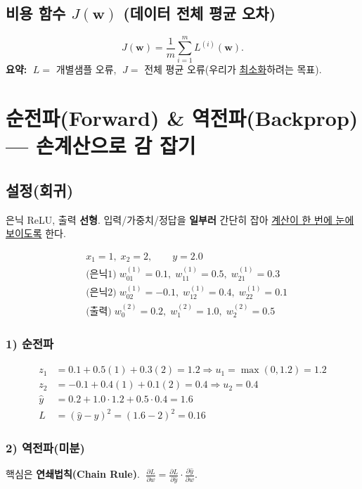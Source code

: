 \documentclass[12pt]{article}
\begin{document}
\subsection{비용 함수 $J(\mathbf{w})$ (데이터 전체 평균 오차)}
\[
J(\mathbf{w}) = \frac{1}{m}\sum_{i=1}^m L^{(i)}(\mathbf{w}).
\]
\textbf{요약:} \(\;L=\) 개별샘플 오류, \(\;J=\) 전체 평균 오류(우리가 \underline{최소화}하려는 목표).

\section{순전파(Forward) \& 역전파(Backprop) — 손계산으로 감 잡기}
\subsection{설정(회귀)}
은닉 ReLU, 출력 \textbf{선형}. 입력/가중치/정답을 \textbf{일부러} 간단히 잡아 \underline{계산이 한 번에 눈에 보이도록} 한다.

\[
\begin{aligned}
&x_1=1,\; x_2=2,\qquad y=2.0 \\
&\text{(은닉1)}\; w^{(1)}_{01}=0.1,\; w^{(1)}_{11}=0.5,\; w^{(1)}_{21}=0.3 \\
&\text{(은닉2)}\; w^{(1)}_{02}=-0.1,\; w^{(1)}_{12}=0.4,\; w^{(1)}_{22}=0.1 \\
&\text{(출력)}\; w^{(2)}_0=0.2,\; w^{(2)}_1=1.0,\; w^{(2)}_2=0.5
\end{aligned}
\]

\subsubsection*{1) 순전파}
\[
\begin{aligned}
z_1 &= 0.1 + 0.5(1) + 0.3(2) = 1.2 \Rightarrow u_1=\max(0,1.2)=1.2\\
z_2 &= -0.1 + 0.4(1) + 0.1(2)=0.4 \Rightarrow u_2=0.4\\
\hat{y} &= 0.2 + 1.0\cdot 1.2 + 0.5\cdot 0.4 = 1.6\\
L &= (\hat{y}-y)^2 = (1.6-2)^2 = 0.16
\end{aligned}
\]

\subsubsection*{2) 역전파(미분)}
핵심은 \textbf{연쇄법칙(Chain Rule)}. \(\; \frac{\partial L}{\partial w}=\frac{\partial L}{\partial \hat{y}}\cdot \frac{\partial \hat{y}}{\partial w}\).
\end{document}
